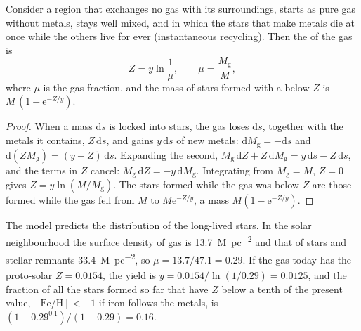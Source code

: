 \begin{theorem}\label{thm:b3:origin-of-elements:closed-box}
Consider a region that exchanges no gas with its surroundings, starts as
pure gas without metals, stays well mixed, and in which the stars that
make metals die at once while the others live for ever (instantaneous
recycling). Then the  of the gas is
\[
Z = y \ln\frac{1}{\mu}, \qquad \mu = \frac{M_\mathrm{g}}{M},
\]
where $\mu$ is the gas fraction, and the mass of stars formed with a
 below $Z$ is \mbox{$M\,(1 - \mathrm{e}^{-Z/y})$}.
\end{theorem}

\begin{proof}
When a mass $\mathrm{d}s$ is locked into stars, the gas loses
$\mathrm{d}s$, together with the metals it contains, $Z\,\mathrm{d}s$,
and gains $y\,\mathrm{d}s$ of new metals:
$\mathrm{d}M_\mathrm{g} = -\mathrm{d}s$ and
$\mathrm{d}(Z M_\mathrm{g}) = (y - Z)\,\mathrm{d}s$. Expanding the
second, $M_\mathrm{g}\,\mathrm{d}Z + Z\,\mathrm{d}M_\mathrm{g} =
y\,\mathrm{d}s - Z\,\mathrm{d}s$, and the terms in $Z$ cancel:
$M_\mathrm{g}\,\mathrm{d}Z = -y\,\mathrm{d}M_\mathrm{g}$. Integrating
from $M_\mathrm{g} = M$, $Z = 0$ gives $Z = y\ln(M/M_\mathrm{g})$. The
stars formed while the gas  was below $Z$ are those formed
while the gas fell from $M$ to $M\mathrm{e}^{-Z/y}$, a mass
$M(1 - \mathrm{e}^{-Z/y})$.
\end{proof}

The model predicts the  distribution of the long-lived stars.
In the solar neighbourhood the surface density of gas is
\qty{13.7}{M_\odot.pc^{-2}} and that of stars and stellar remnants
\qty{33.4}{M_\odot.pc^{-2}}, so $\mu = 13.7/47.1 = 0.29$. If the gas
today has the proto-solar $Z = 0.0154$, the yield is
$y = 0.0154/\ln(1/0.29) = 0.0125$, and the fraction of all the stars
formed so far that have $Z$ below a tenth of the present value,
$[\mathrm{Fe/H}] < -1$ if iron follows the metals, is
$(1 - 0.29^{0.1})/(1 - 0.29) = 0.16$.

